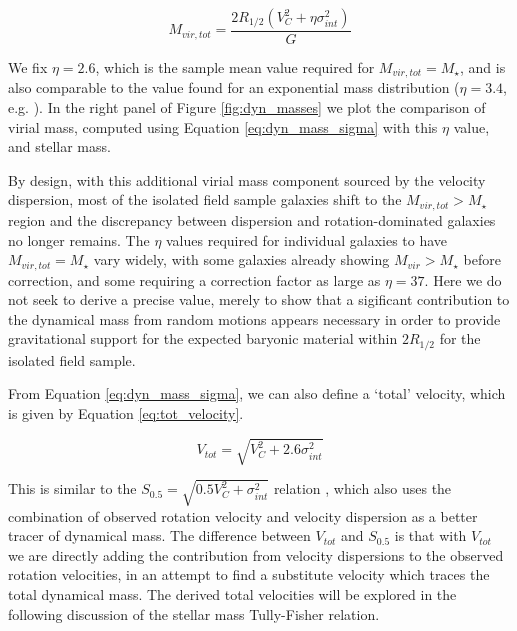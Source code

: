 \documentclass[fleqn,usenatbib]{mnras}
\begin{document}
\begin{equation}\label{eq:dyn_mass_sigma}
   M_{vir,tot} = \frac{2R_{1/2}\left(V_{C}^{2} + \eta\sigma_{int}^{2}\right)}{G}
\end{equation}

\noindent
We fix $\eta=2.6$, which is the sample mean value required for $M_{vir,tot}=M_{\star}$, and is also comparable to the value found for an exponential mass distribution ($\eta=3.4$, e.g. \citealt{Burkert2010,Newman2013}).
In the right panel of Figure \ref{fig:dyn_masses} we plot the comparison of virial mass, computed using Equation \ref{eq:dyn_mass_sigma} with this $\eta$ value, and stellar mass.

By design, with this additional virial mass component sourced by the velocity dispersion, most of the isolated field sample galaxies shift to the $M_{vir,tot} > M_{\star}$ region and the discrepancy between dispersion and rotation-dominated galaxies no longer remains.
The $\eta$ values required for individual galaxies to have $M_{vir,tot}=M_{\star}$ vary widely, with some galaxies already showing $M_{vir} > M_{\star}$ before correction, and some requiring a correction factor as large as $\eta=37$.
Here we do not seek to derive a precise value, merely to show that a sigificant contribution to the dynamical mass from random motions appears necessary in order to provide gravitational support for the expected baryonic material within $2R_{1/2}$ for the isolated field sample.

From Equation \ref{eq:dyn_mass_sigma}, we can also define a `total' velocity, which is given by Equation \ref{eq:tot_velocity}.

\begin{equation}\label{eq:tot_velocity}
   V_{tot} = \sqrt{V_{C}^{2} + 2.6\sigma_{int}^{2}}
\end{equation}

\noindent
This is similar to the $S_{0.5} = \sqrt{0.5V_{C}^{2} + \sigma_{int}^{2}}$ relation \citep{Kassin2007}, which also uses the combination of observed rotation velocity and velocity dispersion as a better tracer of dynamical mass.
The difference between $V_{tot}$ and $S_{0.5}$ is that with $V_{tot}$ we are directly adding the contribution from velocity dispersions to the observed rotation velocities, in an attempt to find a substitute velocity which traces the total dynamical mass.
The derived total velocities will be explored in the following discussion of the stellar mass Tully-Fisher relation. 
\end{document}

